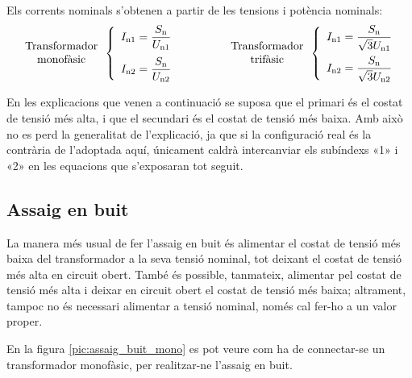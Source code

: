Els corrents nominals s'obtenen a partir de les tensions i potència
nominals:
\begin{equation}
\begin{array}{c}\text{Transformador}\\
\text{monofàsic}
\end{array} \left\{
\begin{array}{l}
   I_\mathrm{n1} = \dfrac{S_\mathrm{n}}{U_\mathrm{n1}} \\[2.7ex]
   I_\mathrm{n2} = \dfrac{S_\mathrm{n}}{U_\mathrm{n2}}
\end{array}
\right. \qquad\qquad
\begin{array}{c}\text{Transformador}\\
\text{trifàsic}
\end{array} \left\{
\begin{array}{l}
   I_\mathrm{n1} = \dfrac{S_\mathrm{n}}{\sqrt{3}U_\mathrm{n1}} \\[2.5ex]
   I_\mathrm{n2} = \dfrac{S_\mathrm{n}}{\sqrt{3}U_\mathrm{n2}}
\end{array}
\right.
\end{equation}

En les explicacions que venen a continuació se suposa que el
primari és el costat de tensió més alta, i que el secundari és el costat de tensió més baixa. Amb això no es perd la generalitat de
l'explicació, ja que si la configuració real és la contrària de l'adoptada aquí, únicament caldrà intercanviar els subíndexs «1» i «2» en
les equacions que s'exposaran tot seguit.

\subsection{Assaig en buit}

La manera més usual de fer l'assaig en buit és alimentar el costat
de  tensió més baixa del transformador a  la seva tensió nominal, tot
deixant el costat de tensió més alta en circuit obert. També és possible,
tanmateix, alimentar pel costat de tensió més alta i deixar en circuit
obert el costat de  tensió més baixa; altrament, tampoc no és necessari
alimentar a tensió nominal, només cal fer-ho a un valor proper.

En la figura \vref{pic:assaig_buit_mono} es pot veure com ha de
connectar-se un transformador monofàsic, per  realitzar-ne
l'assaig en buit.

\begin{center}
    
    \label{pic:assaig_buit_mono}
\end{center}


